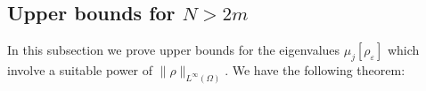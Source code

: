 \documentclass[11pt,a4paper]{amsart}
\numberwithin{equation}{section}
\begin{document}




\subsection{Upper bounds for \texorpdfstring{$N>2m$}{N>2m}}\label{sub:43}
In this subsection we prove upper bounds for the eigenvalues $\mu_j[\rho_{\varepsilon}]$ which involve a suitable power of $\|\rho\|_{L^{\infty}(\Omega)}$. We have the following theorem:
\end{document}
